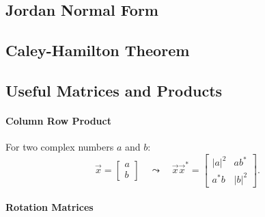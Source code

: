 \subsection{Jordan Normal Form}


\subsection{Caley-Hamilton Theorem}


\subsection{Useful Matrices and Products}

\paragraph{Column Row Product}

For two complex numbers \(a\) and \(b\):
\[
	\vec{x} =
	\begin{bmatrix}
		a \\ b
	\end{bmatrix}
	\quad
	\leadsto
	\quad
	\vec{x} \vec{x}^* =
	\begin{bmatrix}
		|a|^2 & a b^* \\
		a^* b & |b|^2
	\end{bmatrix}.
\]

\paragraph{Rotation Matrices}

